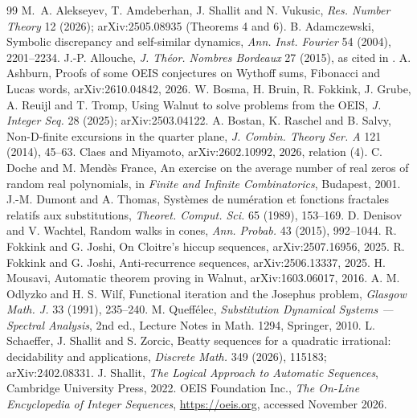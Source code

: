 \begin{thebibliography}{99}\small
{} M.~A. Alekseyev, T. Amdeberhan, J. Shallit and N. Vukusic, \emph{Res. Number Theory} 12 (2026);
arXiv:2505.08935 (Theorems 4 and 6).
 B. Adamczewski, Symbolic discrepancy and self-similar dynamics, \emph{Ann. Inst. Fourier} 54 (2004), 2201--2234.
 J.-P. Allouche, \emph{J. Théor. Nombres Bordeaux} 27 (2015), as cited in .
 A. Ashburn, Proofs of some OEIS conjectures on Wythoff sums, Fibonacci and Lucas words, arXiv:2610.04842, 2026.
 W. Bosma, H. Bruin, R. Fokkink, J. Grube, A. Reuijl and T. Tromp, Using Walnut to solve problems from
the OEIS, \emph{J. Integer Seq.} 28 (2025); arXiv:2503.04122.
 A. Bostan, K. Raschel and B. Salvy, Non-D-finite excursions in the quarter plane, \emph{J. Combin.
Theory Ser. A} 121 (2014), 45--63.
 Claes and Miyamoto, arXiv:2602.10992, 2026, relation (4).
 C. Doche and M. Mend\`es France, An exercise on the average number of real zeros of random real
polynomials, in \emph{Finite and Infinite Combinatorics}, Budapest, 2001.
 J.-M. Dumont and A. Thomas, Syst\`emes de num\'eration et fonctions fractales relatifs aux
substitutions, \emph{Theoret. Comput. Sci.} 65 (1989), 153--169.
 D. Denisov and V. Wachtel, Random walks in cones, \emph{Ann. Probab.} 43 (2015), 992--1044.
 R. Fokkink and G. Joshi, On Cloitre's hiccup sequences, arXiv:2507.16956, 2025.
 R. Fokkink and G. Joshi, Anti-recurrence sequences, arXiv:2506.13337, 2025.
 H. Mousavi, Automatic theorem proving in Walnut, arXiv:1603.06017, 2016.
 A. M. Odlyzko and H. S. Wilf, Functional iteration and the Josephus problem, \emph{Glasgow Math. J.}
33 (1991), 235--240.
 M. Queffélec, \emph{Substitution Dynamical Systems --- Spectral Analysis}, 2nd ed., Lecture Notes in
Math. 1294, Springer, 2010.
 L. Schaeffer, J. Shallit and S. Zorcic, Beatty sequences for a quadratic irrational: decidability and
applications, \emph{Discrete Math.} 349 (2026), 115183; arXiv:2402.08331.
 J. Shallit, \emph{The Logical Approach to Automatic Sequences}, Cambridge University Press, 2022.
 OEIS Foundation Inc., \emph{The On-Line Encyclopedia of Integer Sequences}, \url{https://oeis.org},
accessed November 2026.
\end{thebibliography}
